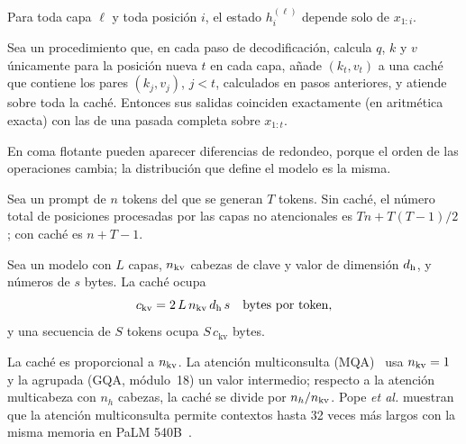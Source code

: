 \begin{lema}\label{lem:causal}
Para toda capa $\ell$ y toda posición $i$, el estado $h^{(\ell)}_i$ depende solo de $x_{1:i}$.
\end{lema}

\begin{teorema}\label{teo:cache}
Sea un procedimiento que, en cada paso de decodificación, calcula $q$, $k$ y $v$ únicamente para la posición nueva $t$ en cada capa, añade $(k_t,v_t)$ a una caché que contiene los pares $(k_j,v_j)$, $j<t$, calculados en pasos anteriores, y atiende sobre toda la caché. Entonces sus salidas coinciden exactamente (en aritmética exacta) con las de una pasada completa sobre $x_{1:t}$.
\end{teorema}

En coma flotante pueden aparecer diferencias de redondeo, porque el orden de las operaciones cambia; la distribución que define el modelo es la misma.

\begin{proposicion}\label{prop:pasadas}
Sea un prompt de $n$ tokens del que se generan $T$ tokens. Sin caché, el número total de posiciones procesadas por las capas no atencionales es $Tn+T(T-1)/2$; con caché es $n+T-1$.
\end{proposicion}

\addtocounter{figure}{1}%

\begin{proposicion}\label{prop:tam-cache}
Sea un modelo con $L$ capas, $n_{\mathrm{kv}}$ cabezas de clave y valor de dimensión $d_{\mathrm{h}}$, y números de $s$ bytes. La caché ocupa
\[
c_{\mathrm{kv}}=2\,L\,n_{\mathrm{kv}}\,d_{\mathrm{h}}\,s\quad\text{bytes por token,}
\]
y una secuencia de $S$ tokens ocupa $S\,c_{\mathrm{kv}}$ bytes.
\end{proposicion}

\addtocounter{definicion}{1}%

\begin{observacion}
La caché es proporcional a $n_{\mathrm{kv}}$. La atención multiconsulta (MQA)~\cite{shazeer} usa $n_{\mathrm{kv}}=1$ y la agrupada (GQA, módulo~18) un valor intermedio; respecto a la atención multicabeza con $n_h$ cabezas, la caché se divide por $n_h/n_{\mathrm{kv}}$. Pope \emph{et al.} muestran que la atención multiconsulta permite contextos hasta 32 veces más largos con la misma memoria en PaLM 540B~\cite{pope}.
\end{observacion}

